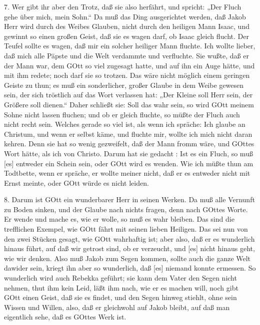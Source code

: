 7. Wer gibt ihr aber den Trotz, daß sie also herfährt, und spricht: „Der Fluch gehe über mich, mein Sohn.“ Da muß das Ding ausgerichtet werden, daß Jakob Herr wird durch des Weibes Glauben, nicht durch den heiligen Mann Isaac, und gewinnt so einen großen Geist, daß sie es wagen darf, ob Isaac gleich flucht. Der Teufel sollte es wagen, daß mir ein solcher heiliger Mann fluchte. Ich wollte lieber, daß mich alle Päpste und die Welt verdammte und verfluchte. Sie wußte, daß er der Mann war, dem GOtt so viel zugesagt hatte, und auf ihn ein Auge hätte, und mit ihm redete; noch darf sie so trotzen. Das wäre nicht möglich einem geringen Geiste zu thun; es muß ein sonderlicher, großer Glaube in dem Weibe gewesen sein, der sich tröstlich auf das Wort verlassen hat: „Der Kleine soll Herr sein, der Größere soll dienen.“ Daher schließt sie: Soll das wahr sein, so wird GOtt meinem Sohne nicht lassen fluchen; und ob er gleich fluchte, so müßte der Fluch auch nicht recht sein. Welches gerade so viel ist, als wenn ich spräche: Ich glaube an Christum, und wenn er selbst käme, und fluchte mir, wollte ich mich nicht daran kehren. Denn sie hat so wenig gezweifelt, daß der Mann fromm wäre, und GOttes Wort hätte, als ich von Christo. Darum hat sie gedacht
: Ist es ein Fluch, so muß [es] entweder ein Schein sein, oder GOtt wird es wenden. Wie ich müßte thun am Todtbette, wenn er spräche, er wollte meiner nicht, daß er es entweder nicht mit Ernst meinte, oder GOtt würde es nicht leiden.

8. Darum ist GOtt ein wunderbarer Herr in seinen Werken. Da muß alle Vernunft zu Boden sinken, und der Glaube nach nichts fragen, denn nach GOttes Worte. Er wende und mache es, wie er wolle, so muß es wahr bleiben. Das sind die trefflichen Exempel, wie GOtt fährt mit seinen lieben Heiligen. Das sei nun von den zwei Stücken gesagt, wie GOtt wahrhaftig ist; aber also, daß er es wunderlich hinaus führt, auf daß wir getrost sind, ob er verzeucht, und [es] nicht hinaus geht, wie wir denken. Also muß Jakob zum Segen kommen, sollte auch die ganze Welt dawider sein, kriegt ihn aber so wunderlich, daß [es] niemand konnte ermessen. So wunderlich wird auch Rebekka geführt; sie kann dem Vater den Segen nicht nehmen, thut ihm kein Leid, läßt ihm nach, wie er es machen will, noch gibt GOtt einen Geist, daß sie es findet, und den Segen hinweg stiehlt, ohne sein Wissen und Willen, also, daß er gleichwohl auf Jakob bleibt, auf daß man eigentlich sehe, daß es GOttes Werk ist.

